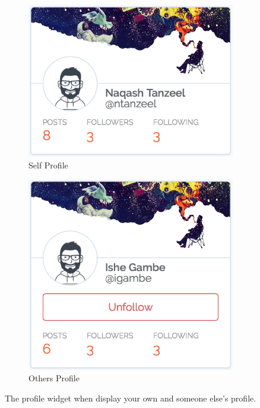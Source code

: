 \begin{figure}[H]
	\centering
	\begin{subfigure}[b]{0.5\linewidth}
		\includegraphics[width=1\textwidth]{Images/Design/UI/Widgets/Profile_Self}
		\caption{Self Profile}
		\label{fig:ProfileWidget_Self}
	\end{subfigure}
	\begin{subfigure}[b]{0.4\linewidth}
		\includegraphics[width=1\textwidth]{Images/Design/UI/Widgets/Profile_Other}
		\caption{Others Profile}
		\label{fig:ProfileWidget_Other}
	\end{subfigure}
	\caption{The profile widget when display your own and someone else's profile.}
	\label{fig:ProfileWidget}
\end{figure}


